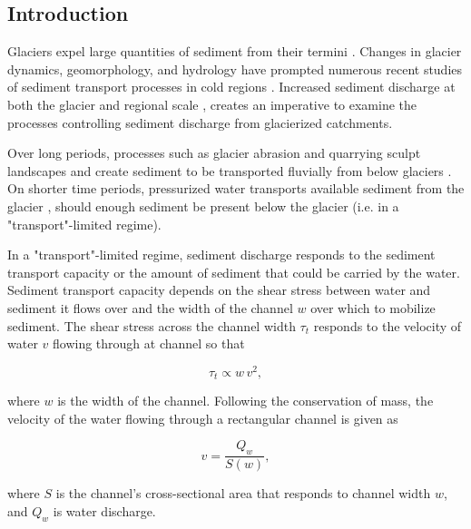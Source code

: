 \documentclass[11pt]{article}
\begin{document}
\begin{spacing}{1}
  \section{Introduction}

  Glaciers expel large quantities of sediment from their termini \citep{hallet1996}.
  Changes in glacier dynamics, geomorphology, and hydrology  have prompted numerous  recent studies of  sediment transport processes in cold regions \citep[e.g.][]{zhang2022}.
  Increased sediment discharge at both the glacier and regional scale \citep{costa2017,delaney2020,li2022,vergara2022}, creates an imperative to examine the processes controlling sediment discharge from glacierized catchments. 
    
Over long periods, processes such as glacier abrasion and quarrying sculpt landscapes and create sediment to be transported fluvially from below glaciers \citep[c.f.][]{hallet1979,iverson1993,herman2021}. 
 On shorter time periods, pressurized water transports available sediment from the glacier \citep{creyts2013,beaud2018b,delaney2019}, should enough sediment be present below the glacier (i.e. in a "transport"-limited regime).
 
In a "transport"-limited regime, sediment discharge responds to the sediment transport capacity or the amount of sediment that could be carried by the water. Sediment transport capacity depends on the shear stress between water and sediment it flows  over \citep{shields1936,meyer1948,engelund1967} and the width of the channel $w$ over which to mobilize sediment. The shear stress  across the channel width $\tau_t$ responds to the velocity of water $v$ flowing through at channel so that 
\begin{linenomath*}
    \begin{equation}
      \label{eq:tau_t}
        \tau_t \propto w\, v^2,
        \end{equation}
  \end{linenomath*}
  where $w$ is the width of the channel.
  Following the conservation of mass, the velocity of the water flowing through a rectangular channel is given as 
  \begin{linenomath*}
    \begin{equation}
      \label{eq:v}
  v = \frac{Q_w}{S(w)},
  \end{equation}
  \end{linenomath*}
%
where $S$ is the channel's cross-sectional area that responds to channel width $w$, and $Q_w$ is water discharge. 


\end{spacing}
\end{document}
